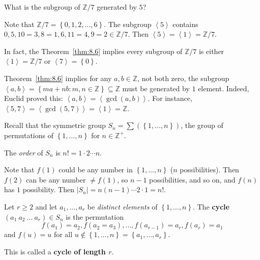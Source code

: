 \documentclass{notes}
\begin{document}
\begin{eg}
  What is the subgroup of $\mathbb Z / 7$ generated by $5$?

  Note that $\mathbb Z / 7 = \left \{ 0, 1, 2, \dots, 6 \right \}$.
  The subgroup $\left \langle 5 \right \rangle$ contains $0, 5, 10 = 3, 8 = 1, 6, 11 = 4, 9 = 2 \in \mathbb Z / 7$.
  Then $\left \langle 5 \right \rangle = \left \langle 1 \right \rangle = \mathbb Z / 7$.

  In fact, the Theorem~\ref{thm:8.6} implies every subgroup of $\mathbb Z / 7$ is either $\left \langle 1 \right \rangle = \mathbb Z / 7$ or $\left \langle 7 \right \rangle = \left \{ 0 \right \}$.
\end{eg}

\begin{eg}
  Theorem~\ref{thm:8.6} implies for any $a, b \in \mathbb Z$, not both zero, the subgroup $\left \langle a, b \right \rangle = \left \{ m a + n b : m, n \in \mathbb Z \right \} \subseteq \mathbb Z$ must be generated by $1$ element.
  Indeed, Euclid proved this: $\left \langle a, b \right \rangle = \left \langle \gcd(a, b) \right \rangle$.
  For instance, $\left \langle 5, 7 \right \rangle = \left \langle \gcd(5, 7) \right \rangle = \left \langle 1 \right \rangle = \mathbb Z$.
\end{eg}

\underline{}

Recall that the symmetric group $S_n = \sum\left ( \left \{ 1, \dots, n \right \} \right )$, the group of permutations of $\left \{ 1, \dots, n \right \}$ for $n \in \mathbb Z^+$.

\begin{note}
  The \textit{order} of $S_n$ is $n! = 1 \cdot 2 \cdots n$.
\end{note}

\begin{prf}
  Note that $f(1)$ could be any number in $\left \{ 1, \dots, n \right \}$ ($n$ possibilities).
  Then $f(2)$ can be any number $\neq f(1)$, so $n - 1$ possibilities, and so on, and $f(n)$ has $1$ possibility.
  Then $\left | S_n \right | = n (n - 1) \cdots 2 \cdot 1 = n!$.
\end{prf}

\begin{defn}
  Let $r \geq 2$ and let $a_1, \dots, a_r$ be \textit{distinct elements} of $\left \{ 1, \dots, n \right \}$.
  The {\boldmath \bfseries cycle $(a_1\ a_2\ \dots\ a_r) \in S_n$} is the permutation 
  \[
    f(a_1) = a_2, f(a_2 = a_3), \dots, f(a_{r - 1}) = a_r, f(a_r) = a_1
  \]
  and 
  $f(u) = u$ for all $u \not \in \left \{ 1, \dots, n \right \} = \left \{ a_1, \dots, a_r \right \}$.

  This is called a {\boldmath \bfseries cycle of length $r$}.
\end{defn}
\end{document}
